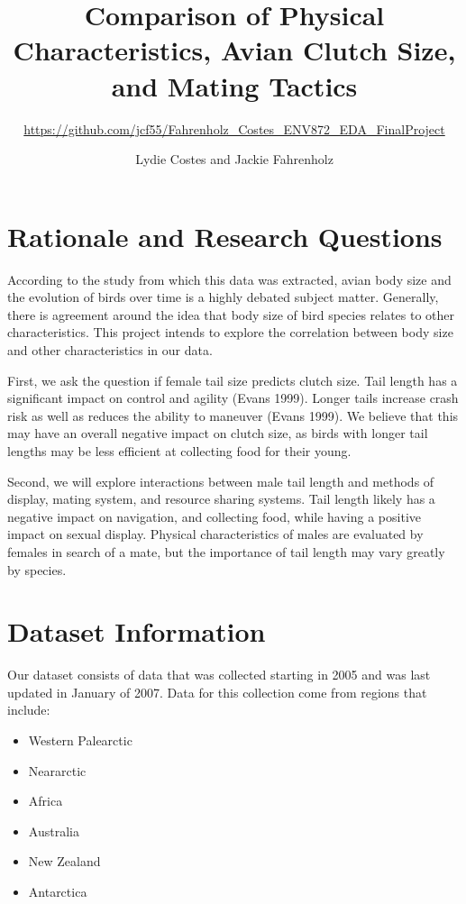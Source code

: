 \documentclass[
  12pt,
]{article}
\title{Comparison of Physical Characteristics, Avian Clutch Size, and
Mating Tactics}
\subtitle{\url{https://github.com/jcf55/Fahrenholz_Costes_ENV872_EDA_FinalProject}}
\author{Lydie Costes and Jackie Fahrenholz}
\date{}
\providecommand{\tightlist}{%
  \setlength{\itemsep}{0pt}\setlength{\parskip}{0pt}}
\begin{document}
\maketitle

\newpage
\tableofcontents 
\newpage
\listoftables 
\listoffigures 
\newpage

\hypertarget{rationale-and-research-questions}{%
\section{Rationale and Research
Questions}\label{rationale-and-research-questions}}

According to the study from which this data was extracted, avian body
size and the evolution of birds over time is a highly debated subject
matter. Generally, there is agreement around the idea that body size of
bird species relates to other characteristics. This project intends to
explore the correlation between body size and other characteristics in
our data.

First, we ask the question if female tail size predicts clutch size.
Tail length has a significant impact on control and agility (Evans
1999). Longer tails increase crash risk as well as reduces the ability
to maneuver (Evans 1999). We believe that this may have an overall
negative impact on clutch size, as birds with longer tail lengths may be
less efficient at collecting food for their young.

Second, we will explore interactions between male tail length and
methods of display, mating system, and resource sharing systems. Tail
length likely has a negative impact on navigation, and collecting food,
while having a positive impact on sexual display. Physical
characteristics of males are evaluated by females in search of a mate,
but the importance of tail length may vary greatly by species.

\hypertarget{dataset-information}{%
\section{Dataset Information}\label{dataset-information}}

Our dataset consists of data that was collected starting in 2005 and was
last updated in January of 2007. Data for this collection come from
regions that include:

\begin{itemize}
\tightlist
\item
  Western Palearctic
\item
  Neararctic
\item
  Africa
\item
  Australia
\item
  New Zealand
\item
  Antarctica
\end{itemize}
\end{document}
